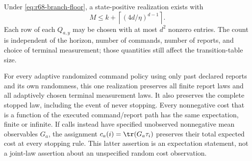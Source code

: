 \begin{theorem}\label{thm:r68-instrument}
Under \eqref{eq:r68-branch-floor}, a state-positive realization exists with
\begin{equation}\label{eq:r68-size}
 M\le k+\left\lceil(4d/\eta)^{d-1}\right\rceil.
\end{equation}
Each row of each $Q_{a,y}$ may be chosen with at most $d^2$ nonzero entries. The count is independent of the horizon, number of commands, number of reports, and choice of terminal measurement; those quantities still affect the transition-table size.

For every adaptive randomized command policy using only past declared reports and its own randomness, this one realization preserves all finite report laws and all adaptively chosen terminal measurement laws. It also preserves the complete stopped law, including the event of never stopping. Every nonnegative cost that is a function of the executed command/report path has the same expectation, finite or infinite. If calls instead have specified unobserved nonnegative mean observables $G_a$, the assignment $c_a(i)=\tr(G_a\tau_i)$ preserves their total expected cost at every stopping rule. This latter assertion is an expectation statement, not a joint-law assertion about an unspecified random cost observation.
\end{theorem}
